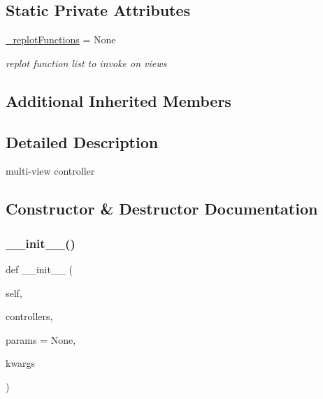 \subsection*{Static Private Attributes}
\begin{DoxyCompactItemize}
\item 
\hyperlink{class_mu_mo_t_1_1_mu_mo_t_1_1_mu_mo_tmulti_controller_a223edb833bfba55f245278156e2cb598}{\+\_\+replot\+Functions} = None
\begin{DoxyCompactList}\small\item\em replot function list to invoke on views \end{DoxyCompactList}\end{DoxyCompactItemize}
\subsection*{Additional Inherited Members}


\subsection{Detailed Description}
multi-\/view controller 

\subsection{Constructor \& Destructor Documentation}
\mbox{\label{class_mu_mo_t_1_1_mu_mo_t_1_1_mu_mo_tmulti_controller_afbddc21036f439ec82b1dfb498e56f04}} 
\subsubsection{\texorpdfstring{\+\_\+\+\_\+init\+\_\+\+\_\+()}{\_\_init\_\_()}}
{\footnotesize\ttfamily def \+\_\+\+\_\+init\+\_\+\+\_\+ (\begin{DoxyParamCaption}\item[{}]{self,  }\item[{}]{controllers,  }\item[{}]{params = {\ttfamily None},  }\item[{}]{kwargs }\end{DoxyParamCaption})}



